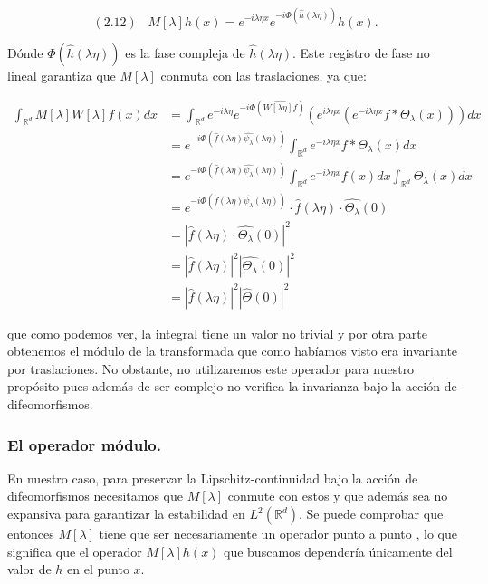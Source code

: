 $$(2.12) \;\;\; M[\lambda]h(x)=e^{-i\lambda\eta x} e^{-i \Phi(\widehat{h}(\lambda\eta))}h(x).$$

\noindent Dónde $\Phi(\widehat{h}(\lambda\eta))$ es la fase compleja de $\widehat{h}(\lambda\eta)$. Este registro de fase no lineal garantiza que $M[\lambda]$ conmuta con las traslaciones, ya que: 


\begin{align*}
  \int_{\mathbb{R}^d} M[\lambda]W[\lambda] f(x) dx &= \int_{\mathbb{R}^d} e^{-i\lambda \eta} e^{-i \Phi (\widehat{W[\lambda\eta]f})} \left( e^{i\lambda\eta x} \left( e^{-i\lambda\eta x} f \ast \Theta_\lambda (x)\right)\right) dx \\
  &= e^{-i \Phi (\widehat{f}(\lambda\eta)\widehat{\psi_\lambda}(\lambda\eta))} \int_{\mathbb{R}^d} e^{-i\lambda\eta x} f \ast \Theta_\lambda (x) dx \\
  &=e^{-i \Phi (\widehat{f}(\lambda\eta)\widehat{\psi_\lambda}(\lambda\eta))} \int_{\mathbb{R}^d}e^{-i\lambda\eta x} f(x) dx  \int_{\mathbb{R}^d}\Theta_\lambda (x) dx  \\
  &=e^{-i \Phi (\widehat{f}(\lambda\eta)\widehat{\psi_\lambda}(\lambda\eta))} \cdot \widehat{f}(\lambda\eta) \cdot  \widehat{\Theta_\lambda}(0)\\
  &=\left| \widehat{f}(\lambda\eta) \cdot  \widehat{\Theta_\lambda}(0) \right|^2 \\
  &=\left| \widehat{f}(\lambda\eta)\right|^2 \left| \widehat{\Theta_\lambda}(0) \right|^2  \\
  &=\left| \widehat{f}(\lambda\eta)\right|^2 \left| \widehat{\Theta}(0) \right|^2 
\end{align*}

\noindent que como podemos ver, la integral tiene un valor no trivial y por otra parte obtenemos el módulo de la transformada que como habíamos visto era invariante por traslaciones. No obstante, no utilizaremos este operador para nuestro propósito pues además de ser complejo no verifica la invarianza bajo la acción de difeomorfismos.

\subsubsection{El operador módulo.}

\noindent En nuestro caso, para preservar la Lipschitz-continuidad bajo la acción de difeomorfismos necesitamos que $M[\lambda]$ conmute con estos y que además sea no expansiva para garantizar la estabilidad en $L^2(\mathbb{R}^d)$. Se puede comprobar que entonces $M[\lambda]$ tiene que ser necesariamente un operador punto a punto \cite{JBrunaOperatorsCommutingDiff}, lo que significa que el operador $M[\lambda]h(x)$ que buscamos dependería únicamente del valor de $h$ en el punto $x$.

